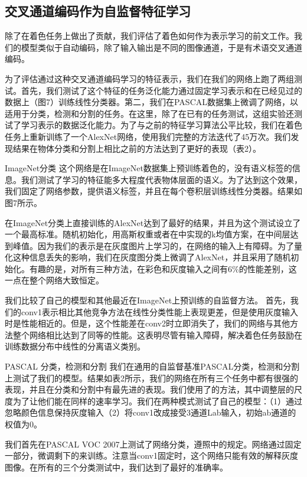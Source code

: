 \subsection{交叉通道编码作为自监督特征学习}

除了在着色任务上做出了贡献，我们评估了着色如何作为表示学习的前文工作。我们的模型类似于自动编码，除了输入输出是不同的图像通道，于是有术语交叉通道编码。

为了评估通过这种交叉通道编码学习的特征表示，我们在我们的网络上跑了两组测试。首先，我们测试了这个特征的任务泛化能力通过固定学习表示和在已经见过的数据上（图7）训练线性分类器。第二，我们在PASCAL数据集上微调了网络，以适用于分类，检测和分割的任务。在这里，除了在已有的任务测试，这组实验还测试了学习表示的数据泛化能力。为了与之前的特征学习算法公平比较，我们在着色任务上重新训练了一个AlexNet网络，使用我们完整的方法迭代了45万次。我们发现结果在物体分类和分割上相比之前的方法达到了更好的表现（表2）。

{\heiti ImageNet分类 } 这个网络是在ImageNet数据集上预训练着色的，没有语义标签的信息。我们测试了学习的特征能多大程度代表物体层面的语义。为了达到这个效果，我们固定了网络参数，提供语义标签，并且在每个卷积层训练线性分类器。结果如图7所示。

在ImageNet分类上直接训练的AlexNet达到了最好的结果，并且为这个测试设立了一个最高标准。随机初始化，用高斯权重或者在中实现的k均值方案，在中间层达到峰值。因为我们的表示是在灰度图片上学习的，在网络的输入上有障碍。为了量化这种信息丢失的影响，我们在灰度图分类上微调了AlexNet，并且采用了随机初始化。有趣的是，对所有三种方法，在彩色和灰度输入之间有6\%的性能差别，这一点在整个网络大致恒定。

我们比较了自己的模型和其他最近在ImageNet上预训练的自监督方法。	首先，我们的conv1表示相比其他竞争方法在线性分类性能上表现更差，但是使用灰度输入时是性能相近的。但是，这个性能差在conv2时立即消失了，我们的网络与其他方法整个网络相比达到了同等的性能。这表明尽管有输入障碍，解决着色任务鼓励在训练数据分布中线性的分离语义类别。

{\heiti PASCAL 分类，检测和分割 } 我们在通用的自监督基准PASCAL分类，检测和分割上测试了我们的模型。结果如表2所示，我们的网络在所有三个任务中都有很强的表现，并且在分类和分割中有最先进的表现。我们使用了的方法，其中调整层的尺度为了让他们能在同样的速率学习。我们在两种模式测试了自己的模型：（1）通过忽略颜色信息保持灰度输入（2）将conv1改成接受3通道Lab输入，初始ab通道的权值为0。

我们首先在PASCAL VOC 2007上测试了网络分类，遵照中的规定。网络通过固定一部分，微调剩下的来训练。注意当conv1固定时，这个网络只能有效的解释灰度图像。在所有的三个分类测试中，我们达到了最好的准确率。

